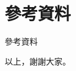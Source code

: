 \documentclass{beamer}
\begin{document}
\section{參考資料}
\begin{frame}{參考資料}
    
  
\end{frame}

\begin{frame}{以上，謝謝大家。}
    
\end{frame}
\end{document}
